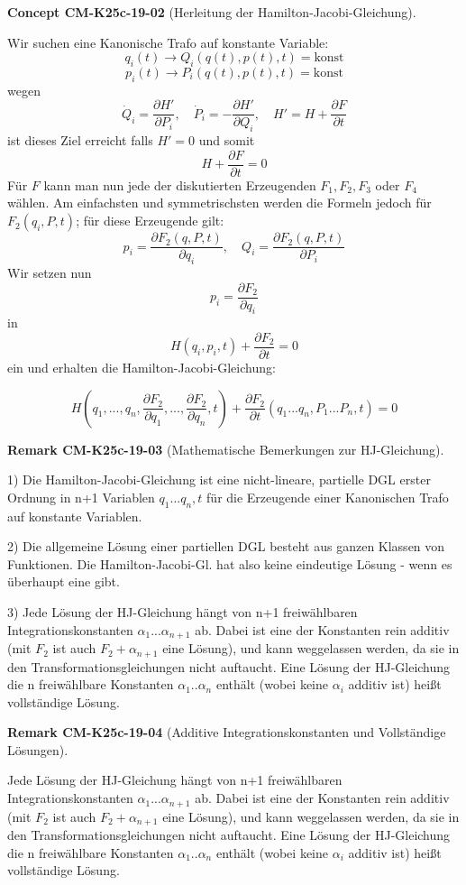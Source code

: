 \documentclass[10pt, letterpaper]{article}
\newcommand{\CustomHeading}[3]{%
  \par\medskip\noindent%
  \textbf{#1 #2} \textnormal{(#3)}.\enskip%
}
\newenvironment{REM}[2]{\CustomHeading{Remark}{#1}{#2}}{}
\newenvironment{CONC}[2]{\CustomHeading{Concept}{#1}{#2}}{}
\begin{document}
\begin{CONC}{CM-K25c-19-02}{Herleitung der Hamilton-Jacobi-Gleichung}
Wir suchen eine Kanonische Trafo auf konstante Variable:
\[q_i(t) \rightarrow Q_i(q(t),p(t),t) = \text{konst}\]
\[p_i(t) \rightarrow P_i(q(t),p(t),t) = \text{konst}\]
wegen
\[\dot{Q}_i = \frac{\partial H'}{\partial P_i}, \quad \dot{P}_i = -\frac{\partial H'}{\partial Q_i}, \quad H' = H + \frac{\partial F}{\partial t}\]
ist dieses Ziel erreicht falls $H' = 0$ und somit
\[H + \frac{\partial F}{\partial t} = 0\]
Für $F$ kann man nun jede der diskutierten Erzeugenden $F_1, F_2, F_3$ oder $F_4$ wählen. Am einfachsten und symmetrischsten werden die Formeln jedoch für $F_2(q_i,P,t)$; für diese Erzeugende gilt:
\[
p_i = \frac{\partial F_2(q,P,t)}{\partial q_i}, \quad Q_i = \frac{\partial F_2(q,P,t)}{\partial P_i}
\]
Wir setzen nun 
$$p_i = \frac{\partial F_2}{\partial q_i}$$ 
in 
$$H(q_i,p_i,t) + \frac{\partial F_2}{\partial t} = 0$$ 
ein und erhalten die Hamilton-Jacobi-Gleichung:


$$H(q_1,...,q_n,\frac{\partial F_2}{\partial q_1},...,\frac{\partial F_2}{\partial q_n},t) + \frac{\partial F_2}{\partial t}(q_1...q_n,P_1...P_n,t) = 0$$
\end{CONC}

\begin{REM}{CM-K25c-19-03}{Mathematische Bemerkungen zur HJ-Gleichung}
1) Die Hamilton-Jacobi-Gleichung ist eine nicht-lineare, partielle DGL erster Ordnung in n+1 Variablen $q_1...q_n,t$ für die Erzeugende einer Kanonischen Trafo auf konstante Variablen.

2) Die allgemeine Lösung einer partiellen DGL besteht aus ganzen Klassen von Funktionen. Die Hamilton-Jacobi-Gl. hat also keine eindeutige Lösung - wenn es überhaupt eine gibt.

3) Jede Lösung der HJ-Gleichung hängt von n+1 freiwählbaren Integrationskonstanten $\alpha_1...\alpha_{n+1}$ ab. Dabei ist eine der Konstanten rein additiv (mit $F_2$ ist auch $F_2 + \alpha_{n+1}$ eine Lösung), und kann weggelassen werden, da sie in den Transformationsgleichungen nicht auftaucht. Eine Lösung der HJ-Gleichung die n freiwählbare Konstanten $\alpha_1..\alpha_n$ enthält (wobei keine $\alpha_i$ additiv ist) heißt vollständige Lösung.
\end{REM}

\begin{REM}{CM-K25c-19-04}{Additive Integrationskonstanten und Vollständige Lösungen}
Jede Lösung der HJ-Gleichung hängt von n+1 freiwählbaren Integrationskonstanten $\alpha_1...\alpha_{n+1}$ ab. Dabei ist eine der Konstanten rein additiv (mit $F_2$ ist auch $F_2 + \alpha_{n+1}$ eine Lösung), und kann weggelassen werden, da sie in den Transformationsgleichungen nicht auftaucht. Eine Lösung der HJ-Gleichung die n freiwählbare Konstanten $\alpha_1..\alpha_n$ enthält (wobei keine $\alpha_i$ additiv ist) heißt vollständige Lösung.
\end{REM}
\end{document}
